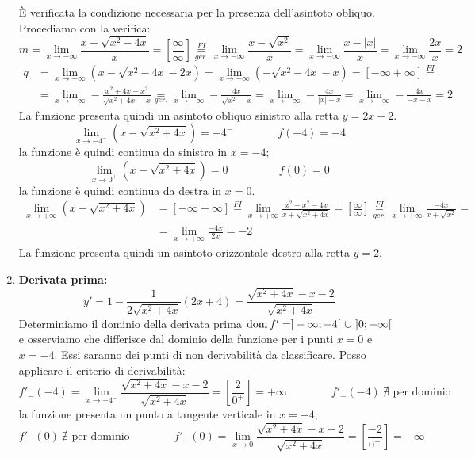 \begin{ex}
\begin{enumerate}
            È verificata la condizione necessaria per la presenza dell'asintoto obliquo. Procediamo con la verifica:
            \[m=\lim_{x\to -\infty}\frac{x-\sqrt{x^2-4x}}{x}=\left[ \frac{\infty}{\infty} \right]\underset{ger.}{\overset{FI}{=}}\lim_{x\to -\infty}\frac{x-\sqrt{x^2}}{x}=\lim_{x\to -\infty}\frac{x-|x|}{x}=\lim_{x\to -\infty}\frac{2x}{x}=2\]
            \[\begin{aligned}
                q&=\lim_{x\to -\infty}\left(x-\sqrt{x^2-4x}-2x\right)=\lim_{x\to -\infty}\left(-\sqrt{x^2-4x}-x\right)=\left[{-\infty+\infty} \right]\overset{FI}{=}\\
                &=\lim_{x\to-\infty}-\frac{x^2+4x-x^2}{\sqrt{x^2+4x}-x}\underset{ger.}{=}\lim_{x\to-\infty}-\frac{4x}{\sqrt{x^2}-x}= \lim_{x\to-\infty}-\frac{4x}{|x|-x}= \lim_{x\to-\infty}-\frac{4x}{-x-x}= 2
            \end{aligned}\]
            La funzione presenta quindi un asintoto obliquo sinistro alla retta $y=2x+2$.
            \[\lim_{x\to -4^-}\left( x-\sqrt{x^2+4x} \right)=-4^-\qquad \qquad f(-4)=-4\]
            la funzione è quindi continua da sinistra in $x=-4$;
            \[\lim_{x\to 0^+}\left( x-\sqrt{x^2+4x} \right)=0^-\qquad \qquad f(0)=0\]
            la funzione è quindi continua da destra in $x=0$.
            \[\begin{aligned}\lim_{x\to+\infty}\left( x-\sqrt{x^2+4x} \right)&=\left[{-\infty+\infty} \right]\overset{FI}{=}\lim_{x\to+\infty}\frac{x^2-x^2-4x}{x+\sqrt{x^2+4x}}=\left[ \frac{\infty}{\infty} \right]\underset{ger.}{\overset{FI}{=}}\lim_{x\to+\infty}\frac{-4x}{x+\sqrt{x^2}}=\\&=\lim_{x\to +\infty}\frac{-4x}{2x}=-2\end{aligned}\]
            La funzione presenta quindi un asintoto orizzontale destro alla retta $y=2$.
            \item \textbf{Derivata prima: }
            \[y'=1-\frac{1}{2\sqrt{x^2+4x}}\left( 2x+4 \right)=\frac{\sqrt{x^2+4x}-x-2}{\sqrt{x^2+4x}}\]
            Determiniamo il dominio della derivata prima $\operatorname{dom} f'=]-\infty;-4[\ \cup \ ]0;+\infty[$ e osserviamo che differisce dal dominio della funzione per i punti $x=0$ e $x=-4$. Essi saranno dei punti di non derivabilità da classificare. Posso applicare il criterio di derivabilità:
            \[f'_-(-4)=\lim_{x\to -4^-}\frac{\sqrt{x^2+4x}-x-2}{\sqrt{x^2+4x}}=\left[\frac{2}{0^+}\right]=+\infty\qquad \qquad f'_+(-4)\ \nexists \text{ per dominio}\]
            la funzione presenta un punto a tangente verticale in $x=-4$;
            \[f'_-(0)\ \nexists \text{ per dominio}\qquad \qquad f'_+(0)=\lim_{x\to 0}\frac{\sqrt{x^2+4x}-x-2}{\sqrt{x^2+4x}}=\left[\frac{-2}{0^+}\right]=-\infty\]

\end{enumerate}
\end{ex}
